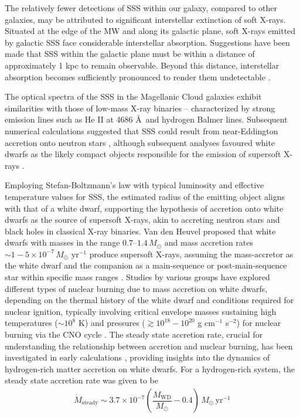     	The relatively fewer detections of SSS within our galaxy, compared to other galaxies, may be attributed to significant interstellar extinction of soft X-rays. Situated at the edge of the MW and along its galactic plane, soft X-rays emitted by galactic SSS face considerable interstellar absorption. Suggestions have been made that SSS within the galactic plane must be within a distance of approximately 1 kpc to remain observable. Beyond this distance, interstellar absorption becomes sufficiently pronounced to render them undetectable \cite{van1992accreting}.
    	
    	The optical spectra of the SSS in the Magellanic Cloud galaxies exhibit similarities with those of low-mass X-ray binaries -- characterized by strong emission lines such as He II at 4686 \AA\ and hydrogen Balmer lines. Subsequent numerical calculations suggested that SSS could result from near-Eddington accretion onto neutron stars \cite{kylafis93}, although subsequent analyses favoured white dwarfs as the likely compact objects responsible for the emission of supersoft X-rays \cite{van1992accreting}.
    	
    	Employing Stefan-Boltzmann's law with typical luminosity and effective temperature values for SSS, the estimated radius of the emitting object aligns with that of a white dwarf, supporting the hypothesis of accretion onto white dwarfs as the source of supersoft X-rays, akin to accreting neutron stars and black holes in classical X-ray binaries. Van den Heuvel proposed that white dwarfs with masses in the range $0.7–1.4\,M_\odot$ and mass accretion rates $\sim 1-5\times 10^{-7}\,M_\odot\text{ yr}^{-1}$ produce supersoft X-rays, assuming the mass-accretor as the white dwarf and the companion as a main-sequence or post-main-sequence star within specific mass ranges \cite{van1992accreting}. Studies by various groups have explored different types of nuclear burning due to mass accretion on white dwarfs, depending on the thermal history of the white dwarf and conditions required for nuclear ignition, typically involving critical envelope masses %
    sustaining high temperatures ($\sim 10^8$ K) and pressures ($\gtrsim 10^{18}-10^{20}$ g cm$^{-1}$ s$^{-2}$) for nuclear burning via the CNO cycle \cite{paczynski78,prialnik78,sion79,sienkiewicz80,nomoto82,fujimoto82a,fujimoto82b,iben82,prialnik95,macdonald83}. The steady state accretion rate, crucial for understanding the relationship between accretion and nuclear burning, has been investigated in early calculations \cite{paczynski80,iben82}, providing insights into the dynamics of hydrogen-rich matter accretion on white dwarfs. For a hydrogen-rich system, the steady state accretion rate was given to be \cite{hachisu2001}
		\begin{align}
			\dot{M}_\text{steady}\sim 3.7\times 10^{-7}\left( \dfrac{M_\text{WD}}{M_\odot}-0.4 \right)\,M_\odot\,\text{yr}^{-1} \label{eqn:steady-mass-accr}
		\end{align}
	
